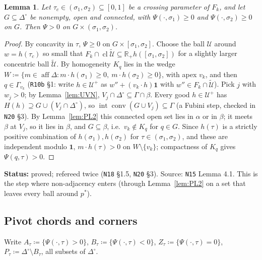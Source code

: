 \documentclass[11pt]{article}
\newtheorem{lemma}[theorem]{Lemma}
\theoremstyle{definition}
\theoremstyle{remark}
\newcommand{\R}{\mathbb R}
\newcommand{\one}{\mathbf 1}
\newcommand{\Di}{\Delta^{\circ}}
\newcommand{\cl}{\operatorname{cl}}
\newcommand{\co}{\operatorname{conv}}
\newcommand{\aff}{\operatorname{aff}}
\newcommand{\src}[1]{\texttt{#1}}
\newcommand{\status}[1]{\par\smallskip\noindent\textbf{Status:} #1\par\smallskip}
\begin{document}
\begin{lemma}\label{lem:nopin}
Let $\tau_c\in(\sigma_1,\sigma_2)\subseteq[0,1]$ be a crossing parameter of $F_k$, and let $G\subseteq\Di$ be nonempty, open and connected, with $\Psi(\cdot,\sigma_1)\ge0$ and $\Psi(\cdot,\sigma_2)\ge0$ on $G$. Then $\Psi>0$ on $G\times(\sigma_1,\sigma_2)$.
\end{lemma}
\begin{proof}
By concavity in $\tau$, $\Psi\ge0$ on $G\times[\sigma_1,\sigma_2]$. Choose the ball $\mathcal U$ around $w=h(\tau_c)$ so small that $F_k\cap\cl\tilde{\mathcal U}\subseteq\R_+h([\sigma_1,\sigma_2])$ for a slightly larger concentric ball $\tilde{\mathcal U}$. By homogeneity $K_q$ lies in the wedge $W\coloneqq\{m\in\aff\Delta:m\cdot h(\sigma_1)\ge0,\ m\cdot h(\sigma_2)\ge0\}$, with apex $v_k$, and then $q\in\Gamma_{v_k}$ (\src{R10b} \S1: write $h\in\mathcal U^+$ as $w''+(v_k\cdot h)\one$ with $w''\in F_k\cap\tilde{\mathcal U}$). Pick $j$ with $w_j>0$; by Lemma~\ref{lem:UVN}, $V_j\cap\Di\subseteq\Gamma\cap\beta$. Every good $h\in\mathcal U^+$ has $H(h)\supseteq G\cup(V_j\cap\Di)$, so $\operatorname{int}\co(G\cup V_j)\subseteq\Gamma$ (a Fubini step, checked in \src{N20} \S3). By Lemma~\ref{lem:PL2} this connected open set lies in $\alpha$ or in $\beta$; it meets $\beta$ at $V_j$, so it lies in $\beta$, and $G\subseteq\beta$, i.e.\ $v_k\notin K_q$ for $q\in G$. Since $h(\tau)$ is a strictly positive combination of $h(\sigma_1),h(\sigma_2)$ for $\tau\in(\sigma_1,\sigma_2)$, and these are independent modulo $\one$, $m\cdot h(\tau)>0$ on $W\setminus\{v_k\}$; compactness of $K_q$ gives $\Psi(q,\tau)>0$.
\end{proof}
\status{proved; refereed twice (\src{N18} \S1.5, \src{N20} \S3). Source: \src{N15} Lemma 4.1. This is the step where non-adjacency enters (through Lemma~\ref{lem:PL2} on a set that leaves every ball around $p^*$).}

\subsection{Pivot chords and corners}

Write $A_\tau\coloneqq\{\Psi(\cdot,\tau)>0\}$, $B_\tau\coloneqq\{\Psi(\cdot,\tau)<0\}$, $Z_\tau\coloneqq\{\Psi(\cdot,\tau)=0\}$, $P_\tau\coloneqq\Di\setminus B_\tau$, all subsets of $\Di$.
\end{document}
